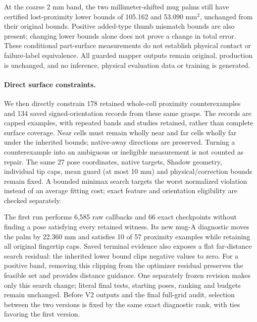 \documentclass[10pt,letterpaper]{article}
\begin{document}
At the coarse 2 mm band, the two millimeter-shifted mug palms still have
certified lost-proximity lower bounds of 105.162 and 53.090 mm$^2$, unchanged
from their original bounds. Positive added-type thumb mismatch bounds are also
present; changing lower bounds alone does not prove a change in total error.
These conditional part-surface measurements do not establish physical contact
or failure-label equivalence. All guarded mapper outputs remain original,
production is unchanged, and no inference, physical evaluation data or training
is generated.
\paragraph{Direct surface constraints.}

We then directly constrain 178 retained whole-cell proximity counterexamples
and 134 saved signed-orientation records from these same grasps. The records
are capped examples, with repeated bands and studies retained, rather than
complete surface coverage. Near cells must remain wholly near and far cells
wholly far under the inherited bounds; native-away directions are preserved.
Turning a counterexample into an ambiguous or ineligible measurement is not
counted as repair. The same 27 pose coordinates, native targets, Shadow
geometry, individual tip caps, mean guard (at most 10 mm) and physical/correction bounds remain
fixed. A bounded minimax search targets the worst normalized violation instead
of an average fitting cost; exact feature and orientation eligibility are
checked separately.

The first run performs 6,585 raw callbacks and 66 exact checkpoints without
finding a pose satisfying every retained witness. Its new mug-A diagnostic
moves the palm by 22.360 mm and satisfies 10 of 57 proximity examples while
retaining all original fingertip caps. Saved terminal evidence also exposes a
flat far-distance search residual: the inherited lower bound clips negative
values to zero. For a positive band, removing this clipping from the optimizer
residual preserves the feasible set and provides distance guidance. One
separately frozen revision makes only this search change; literal final tests,
starting poses, ranking and budgets remain unchanged. Before V2 outputs and the final full-grid audit, selection between the two versions is fixed
by the same exact diagnostic rank, with ties favoring the first version.
\end{document}
